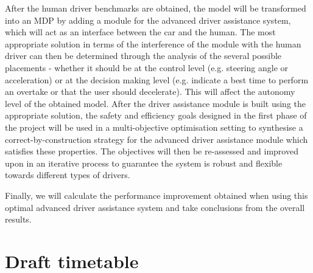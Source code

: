 \documentclass[a4paper]{article}
\begin{document}
After the human driver benchmarks are obtained, the model will be transformed into an MDP by adding a module for the advanced driver assistance system, which will act as an interface between the car and the human. The most appropriate solution in terms of the interference of the module with the human driver can then be determined through the analysis of the several possible placements - whether it should be at the control level (e.g. steering angle or acceleration) or at the decision making level (e.g. indicate a best time to perform an overtake or that the user should decelerate). This will affect the autonomy level of the obtained model. After the driver assistance module is built using the appropriate solution, the safety and efficiency goals designed in the first phase of the project will be used in a multi-objective optimisation setting to synthesise a correct-by-construction strategy for the advanced driver assistance module which satisfies these properties. The objectives will then be re-assessed and improved upon in an iterative process to guarantee the system is robust and flexible towards different types of drivers.

Finally, we will calculate the performance improvement obtained when using this optimal advanced driver assistance system and take conclusions from the overall results.

\section{Draft timetable}
\end{document}
